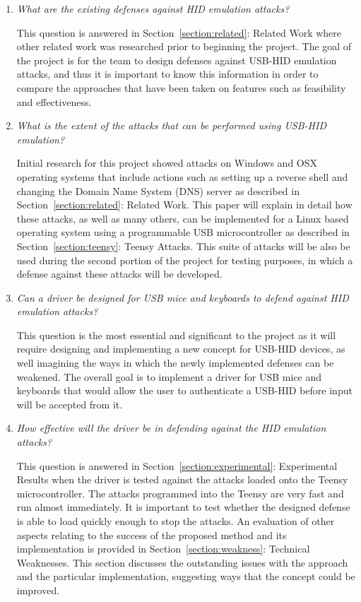 \documentclass[pagenumbers]{ieee}
\begin{document}
\begin{enumerate}
\item \textit{What are the existing defenses against HID emulation attacks?}

This question is answered in Section~\ref{section:related}: Related Work where other related work was researched prior to beginning the project. The goal of the project is for the team to design defenses against USB-HID emulation attacks, and thus it is important to know this information  in order to compare the approaches that have been taken on features such as feasibility and effectiveness.

\item \textit{What is the extent of the attacks that can be performed using USB-HID emulation?}

Initial research for this project showed attacks on Windows and OSX operating systems that include actions such as setting up a reverse shell and changing the Domain Name System (DNS) server as described in Section~\ref{section:related}: Related Work. This paper will explain in detail how these attacks, as well as many others, can be implemented for a Linux based operating system using a programmable USB microcontroller as described in Section~\ref{section:teensy}: Teensy Attacks. This suite of attacks will be also be used during the second portion of the project for testing purposes, in which a defense against these attacks will be developed.

\item \textit{Can a driver be designed for USB mice and keyboards to defend against HID emulation attacks?}

This question is the most essential and significant to the project as it will require designing and implementing a new concept for USB-HID devices, as well imagining the ways in which the newly implemented defenses can be weakened. The overall goal is to implement a driver for USB mice and keyboards that would allow the user to authenticate a USB-HID before input will be accepted from it.

\item \textit{How effective will the driver be in defending against the HID emulation attacks?}

This question is answered in Section~\ref{section:experimental}: Experimental Results when the driver is tested against the attacks loaded onto the Teensy microcontroller. The attacks programmed into the Teensy are very fast and run almost immediately. It is important to test whether the designed defense is able to load quickly enough to stop the attacks. An evaluation of other aspects relating to the success of the proposed method and its implementation is provided in Section~\ref{section:weakness}: Technical Weaknesses. This section discusses the outstanding issues with the approach and the particular implementation, suggesting ways that the concept could be improved.


\end{enumerate}
\end{document}
